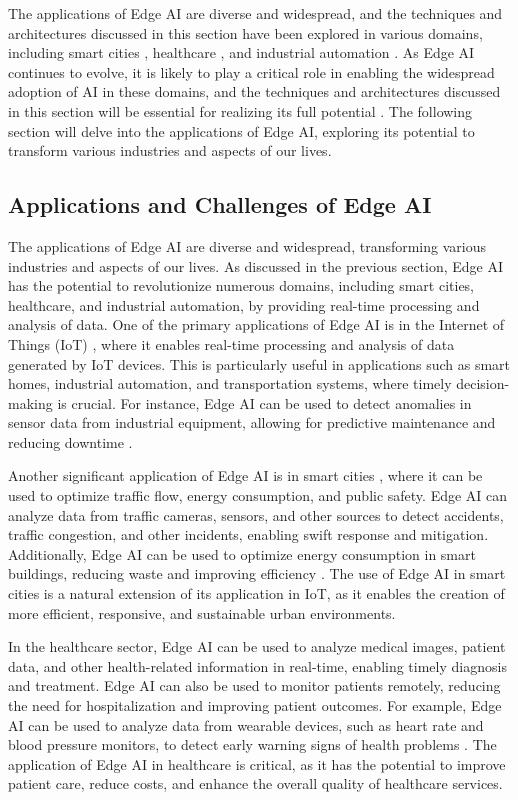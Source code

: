 \documentclass[11pt]{article}
\begin{document}
The applications of Edge AI are diverse and widespread, and the techniques and architectures discussed in this section have been explored in various domains, including smart cities \cite{ref190,ref191}, healthcare \cite{ref192,ref193}, and industrial automation \cite{ref171,ref194}. As Edge AI continues to evolve, it is likely to play a critical role in enabling the widespread adoption of AI in these domains, and the techniques and architectures discussed in this section will be essential for realizing its full potential \cite{ref195,ref196}. The following section will delve into the applications of Edge AI, exploring its potential to transform various industries and aspects of our lives.

\subsection{Applications and Challenges of Edge AI}

The applications of Edge AI are diverse and widespread, transforming various industries and aspects of our lives. As discussed in the previous section, Edge AI has the potential to revolutionize numerous domains, including smart cities, healthcare, and industrial automation, by providing real-time processing and analysis of data. One of the primary applications of Edge AI is in the Internet of Things (IoT) \cite{ref3}, where it enables real-time processing and analysis of data generated by IoT devices. This is particularly useful in applications such as smart homes, industrial automation, and transportation systems, where timely decision-making is crucial. For instance, Edge AI can be used to detect anomalies in sensor data from industrial equipment, allowing for predictive maintenance and reducing downtime \cite{ref3}.

Another significant application of Edge AI is in smart cities \cite{ref25}, where it can be used to optimize traffic flow, energy consumption, and public safety. Edge AI can analyze data from traffic cameras, sensors, and other sources to detect accidents, traffic congestion, and other incidents, enabling swift response and mitigation. Additionally, Edge AI can be used to optimize energy consumption in smart buildings, reducing waste and improving efficiency \cite{ref25}. The use of Edge AI in smart cities is a natural extension of its application in IoT, as it enables the creation of more efficient, responsive, and sustainable urban environments.

In the healthcare sector, Edge AI \cite{ref197} can be used to analyze medical images, patient data, and other health-related information in real-time, enabling timely diagnosis and treatment. Edge AI can also be used to monitor patients remotely, reducing the need for hospitalization and improving patient outcomes. For example, Edge AI can be used to analyze data from wearable devices, such as heart rate and blood pressure monitors, to detect early warning signs of health problems \cite{ref197}. The application of Edge AI in healthcare is critical, as it has the potential to improve patient care, reduce costs, and enhance the overall quality of healthcare services.
\end{document}
